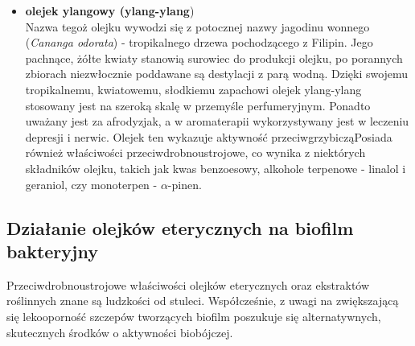 \documentclass[11pt,a4paper]{report}
\begin{document}
\begin{itemize}

\item \textbf{olejek ylangowy (ylang-ylang})\\
Nazwa tegoż olejku wywodzi się z potocznej nazwy jagodinu wonnego (\textit{Cananga odorata}) - tropikalnego drzewa pochodzącego z Filipin. Jego pachnące, żółte kwiaty stanowią surowiec do produkcji olejku, po porannych zbiorach niezwłocznie poddawane są destylacji z parą wodną. 
Dzięki swojemu tropikalnemu, kwiatowemu, słodkiemu zapachowi olejek ylang-ylang stosowany jest na szeroką skalę w przemyśle perfumeryjnym\cite{gorailis}. 
Ponadto uważany jest za afrodyzjak, a w aromaterapii wykorzystywany jest w leczeniu depresji i nerwic\cite{pollena_y}. 
Olejek ten wykazuje aktywność przeciwgrzybiczą\cite{hammer}Posiada również właściwości przeciwdrobnoustrojowe, co wynika z niektórych składników olejku, takich jak kwas benzoesowy, alkohole terpenowe - linalol i geraniol, czy monoterpen - $\alpha$-pinen\cite{kedzia_ylang}. 





\end{itemize}



\subsection{Działanie olejków eterycznych na biofilm bakteryjny}
Przeciwdrobnoustrojowe właściwości olejków eterycznych oraz ekstraktów roślinnych znane są ludzkości od stuleci. Współcześnie, z uwagi na zwiększającą się lekooporność szczepów tworzących biofilm poszukuje się alternatywnych, skutecznych środków o aktywności biobójczej\cite{budzynska,hammer}. 
\end{document}
